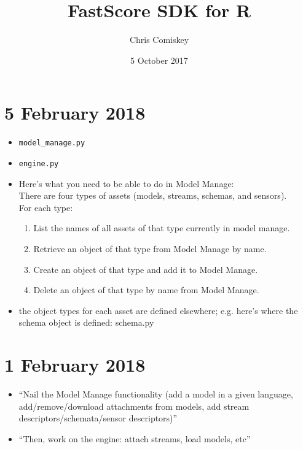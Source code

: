 \documentclass{article}
\title{FastScore SDK for R}
\author{Chris Comiskey}
\date{5 October 2017}
\begin{document}
\maketitle{}

\section*{5 February 2018}
\begin{itemize}
\item \verb|model_manage.py|
\item \verb|engine.py|
\item Here's what you need to be able to do in Model Manage: \\

There are four types of assets (models, streams, schemas, and sensors). \\

For each type:
      \begin{enumerate}
      \item List the names of all assets of that type currently in model manage.
      \item Retrieve an object of that type from Model Manage by name.
      \item Create an object of that type and add it to Model Manage.
      \item Delete an object of that type by name from Model Manage.
      \end{enumerate}
\item the object types for each asset are defined elsewhere; e.g. here's where the schema object is defined: schema.py      
\end{itemize}


\section*{1 February 2018}
\begin{itemize}
\item ``Nail the Model Manage functionality (add a model in a given language, add/remove/download attachments from models, add stream descriptors/schemata/sensor descriptors)''
\item ``Then, work on the engine: attach streams, load models, etc''
\end{itemize}
\end{document}
